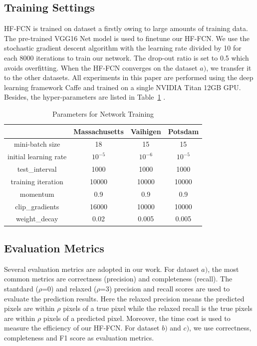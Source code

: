 \subsection{Training Settings}
HF-FCN is trained on dataset a firstly owing to large amounts of training data. The pre-trained VGG16 Net model is used to finetune our HF-FCN. We use the stochastic gradient descent algorithm with the learning rate divided by 10 for each 8000 iterations to train our network. The drop-out ratio is set to 0.5 which avoids overfitting. When the HF-FCN converges on the dataset ${a)}$, we transfer it to the other datasets. All experiments in this paper are performed using the deep learning framework Caffe and trained on a single NVIDIA Titan 12GB GPU. Besides, the hyper-parameters are listed in Table~\ref{table:Train-Parameter} .

\begin{table}
\centering
\caption {Parameters for Network Training}
\label{table:Train-Parameter}
\begin{tabular}{c|c|c|c}
\hline
&Massachusetts &Vaihigen &Potsdam\\  \hline
mini-batch size & 18& 15 & 15 \\
initial learning rate & $10^{-5}$ & $10^{-6}$ & $10^{-5}$\\
test\_interval&1000 & 1000 &1000\\
training iteration & 10000 & 10000& 10000\\
momentum & 0.9 & 0.9 & 0.9\\
clip\_gradients & 16000& 10000 & 10000\\
weight\_decay & 0.02& 0.005 & 0.005\\ \hline
\end{tabular}
\end{table}

\subsection{Evaluation Metrics}
Several evaluation metrics are adopted in our work. For dataset ${a)}$, the most common metrics are correctness (precision) and completeness (recall). 
The stantdard ($\rho$=0) and relaxed ($\rho$=3) precision and recall scores are used to evaluate the prediction results. Here the relaxed precision means the predicted pixels are within $\rho$ pixels of a true pixel while the relaxed recall is the true pixels are within $\rho$ pixels of a predicted pixel. Moreover, the time cost is used to measure the efficiency of our HF-FCN. For dataset ${b)}$ and ${c)}$, we use correctness, completeness and F1 score as evaluation metrics.


